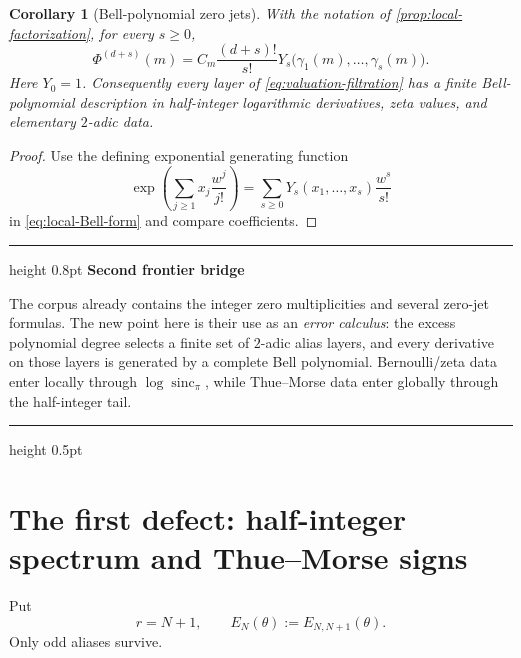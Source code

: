 \documentclass[11pt]{article}
\numberwithin{equation}{section}
\newtheorem{corollary}[theorem]{Corollary}
\theoremstyle{definition}
\theoremstyle{remark}
\newenvironment{resultbox}[1][]
{\begin{center}\begin{minipage}{0.94\textwidth}%
\color{navy}\hrule height 0.8pt\vspace{0.45em}%
\color{black}\textbf{#1}\par\smallskip}
{\vspace{0.35em}\color{navy}\hrule height 0.5pt\end{minipage}\end{center}}
\newcommand{\sincpi}{\operatorname{sinc}_{\pi}}
\begin{document}
\begin{corollary}[Bell-polynomial zero jets]
\label{cor:Bell-zero-jets}
With the notation of \cref{prop:local-factorization}, for every $s\ge0$,
\begin{equation}
 \boxed{\displaystyle
 \Phi^{(d+s)}(m)
 =C_m\frac{(d+s)!}{s!}
 Y_s\bigl(\gamma_1(m),\ldots,\gamma_s(m)\bigr).}
 \label{eq:Bell-zero-jets}
\end{equation}
Here $Y_0=1$.  Consequently every layer of \eqref{eq:valuation-filtration} has a finite Bell-polynomial description in half-integer logarithmic derivatives, zeta values, and elementary $2$-adic data.
\end{corollary}

\begin{proof}
Use the defining exponential generating function
\[
 \exp\!\left(\sum_{j\ge1}x_j\frac{w^j}{j!}\right)
 =\sum_{s\ge0}Y_s(x_1,\ldots,x_s)\frac{w^s}{s!}
\]
in \eqref{eq:local-Bell-form} and compare coefficients.
\end{proof}

\begin{resultbox}[Second frontier bridge]
The corpus already contains the integer zero multiplicities and several zero-jet formulas.  The new point here is their use as an \emph{error calculus}: the excess polynomial degree selects a finite set of $2$-adic alias layers, and every derivative on those layers is generated by a complete Bell polynomial.  Bernoulli/zeta data enter locally through $\log\sincpi$, while Thue--Morse data enter globally through the half-integer tail.
\end{resultbox}

\section{The first defect: half-integer spectrum and Thue--Morse signs}
\label{sec:first-defect}

Put
\begin{equation}
 r=N+1,
 \qquad
 E_N(\theta):=E_{N,N+1}(\theta).
 \label{eq:first-defect-def}
\end{equation}
Only odd aliases survive.
\end{document}
